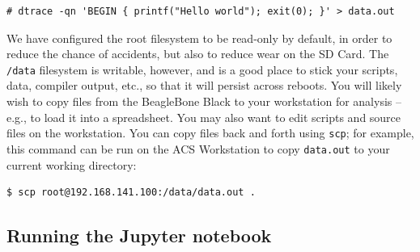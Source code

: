 \documentclass[a4paper,10pt]{article}
\newcommand{\code}[1]{\texttt{\small #1}}
\begin{document}
\begin{small}
\begin{verbatim}
# dtrace -qn 'BEGIN { printf("Hello world"); exit(0); }' > data.out
\end{verbatim}
\end{small}

We have configured the root filesystem to be read-only by default, in order to
reduce the chance of accidents, but also to reduce wear on the SD Card.
The \code{/data} filesystem is writable, however, and is a good place to stick
your scripts, data, compiler output, etc., so that it will persist across
reboots.
You will likely wish to copy files from the BeagleBone Black to your
workstation for analysis -- e.g., to load it into a spreadsheet.
You may also want to edit scripts and source files on the workstation.
You can copy files back and forth using \code{scp}; for example, this command
can be run on the ACS Workstation to copy \code{data.out} to your current
working directory:

\begin{small}
\begin{verbatim}
$ scp root@192.168.141.100:/data/data.out .
\end{verbatim}
\end{small}

%
%
%
%

\subsection*{Running the Jupyter notebook}
\end{document}
